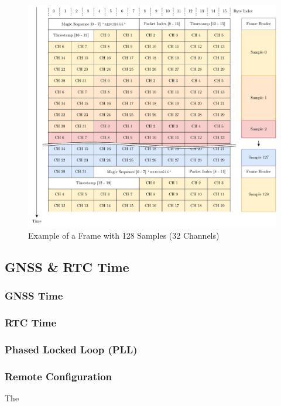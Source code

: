 \begin{figure}[h]
	\centering
	\includegraphics[width=1.0\textwidth]{images/6_design_final/Audio_Stream_Frame.pdf}
	\caption{Example of a Frame with 128 Samples (32 Channels)}
	\label{fig:frame_example}
\end{figure}

\subsection{GNSS \& RTC Time}

\subsubsection{GNSS Time}

\subsubsection{RTC Time}

\subsubsection{Phased Locked Loop (PLL)}

\subsubsection{Remote Configuration}
The

